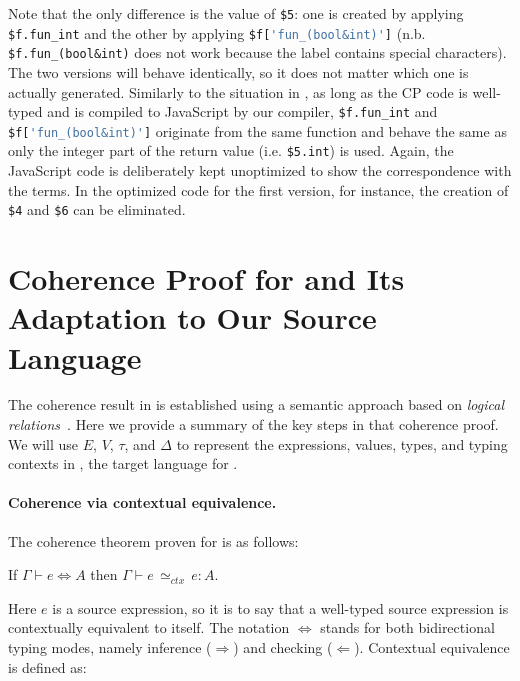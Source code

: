 \noindent
Note that the only difference is the value of \lstinline{$5}: one is created by
applying \lstinline{$f.fun_int} and the other by applying
\lstinline[language=TypeScript]{$f['fun_(bool&int)']}
(n.b. \lstinline{$f.fun_(bool&int)} does not work because the label contains
special characters). The two versions will behave identically, so it does not
matter which one is actually generated. Similarly to the situation in \lambdar,
as long as the CP code is well-typed and is compiled to JavaScript by our
compiler, \lstinline{$f.fun_int} and
\lstinline[language=TypeScript]{$f['fun_(bool&int)']} originate from the same
function and behave the same as only the integer part of the return value  (i.e.
\lstinline{$5.int}) is used. Again, the JavaScript code is deliberately kept
unoptimized to show the correspondence with the \lambdar terms. In the optimized
code for the first version, for instance, the creation of \lstinline{$4} and
\lstinline{$6} can be eliminated.

\section{Coherence Proof for \necolus and Its Adaptation to Our Source Language}
\label{sec:coherence}

The coherence result in \necolus is established using a semantic approach based
on \emph{logical relations}~\citep{tait1967intensional,biernacki2015logical}.
Here we provide a summary of the key steps in that coherence proof. We will use
$E$, $V$, $\tau$, and $\Delta$ to represent the expressions, values, types, and
typing contexts in \lambdac, the target language for \necolus.

\paragraph{Coherence via contextual equivalence.}
The coherence theorem proven for \necolus is as follows:

\begin{theorem}\label{thm:coherence}
If $\Gamma \vdash e \Leftrightarrow A$
then $\Gamma \vdash e \, {\simeq}_\mathit{ctx} \, e : A$.
\end{theorem}

\noindent
Here $e$ is a source expression, so it is to say that a well-typed source
expression is contextually equivalent to itself. The notation $\Leftrightarrow$
stands for both bidirectional typing modes, namely inference ($\Rightarrow$) and
checking ($\Leftarrow$). Contextual equivalence is defined as:

